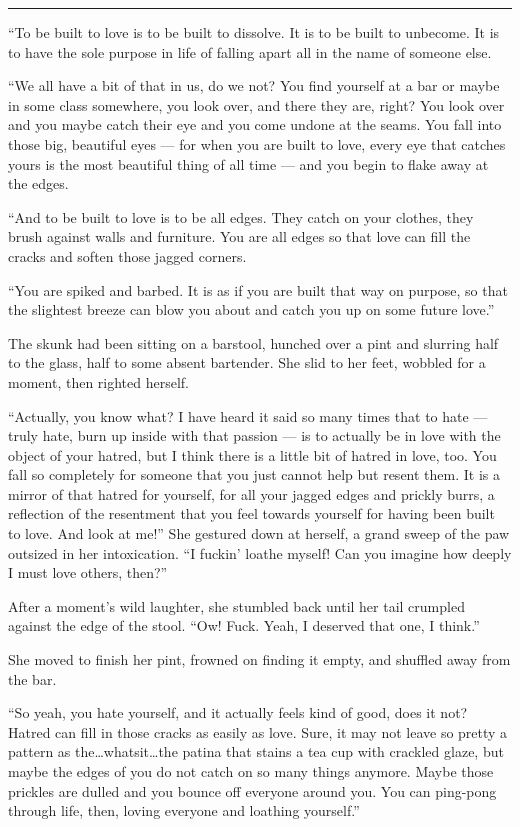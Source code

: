 \begin{center}\rule{0.5\linewidth}{0.5pt}\end{center}

``To be built to love is to be built to dissolve. It is to be built to unbecome. It is to have the sole purpose in life of falling apart all in the name of someone else.

``We all have a bit of that in us, do we not? You find yourself at a bar or maybe in some class somewhere, you look over, and there they are, right? You look over and you maybe catch their eye and you come undone at the seams. You fall into those big, beautiful eyes — for when you are built to love, every eye that catches yours is the most beautiful thing of all time — and you begin to flake away at the edges.

``And to be built to love is to be all edges. They catch on your clothes, they brush against walls and furniture. You are all edges so that love can fill the cracks and soften those jagged corners.

``You are spiked and barbed. It is as if you are built that way on purpose, so that the slightest breeze can blow you about and catch you up on some future love.''

The skunk had been sitting on a barstool, hunched over a pint and slurring half to the glass, half to some absent bartender. She slid to her feet, wobbled for a moment, then righted herself.

``Actually, you know what? I have heard it said so many times that to hate — truly hate, burn up inside with that passion — is to actually be in love with the object of your hatred, but I think there is a little bit of hatred in love, too. You fall so completely for someone that you just cannot help but resent them. It is a mirror of that hatred for yourself, for all your jagged edges and prickly burrs, a reflection of the resentment that you feel towards yourself for having been built to love. And look at me!'' She gestured down at herself, a grand sweep of the paw outsized in her intoxication. ``I fuckin' loathe myself! Can you imagine how deeply I must love others, then?''

After a moment's wild laughter, she stumbled back until her tail crumpled against the edge of the stool. ``Ow! Fuck. Yeah, I deserved that one, I think.''

She moved to finish her pint, frowned on finding it empty, and shuffled away from the bar.

``So yeah, you hate yourself, and it actually feels kind of good, does it not? Hatred can fill in those cracks as easily as love. Sure, it may not leave so pretty a pattern as the\ldots whatsit\ldots the patina that stains a tea cup with crackled glaze, but maybe the edges of you do not catch on so many things anymore. Maybe those prickles are dulled and you bounce off everyone around you. You can ping-pong through life, then, loving everyone and loathing yourself.''

